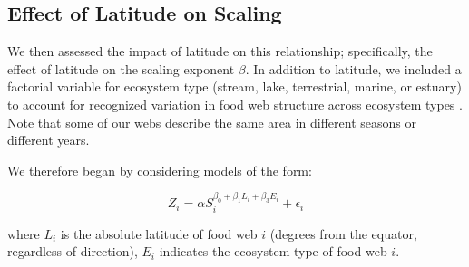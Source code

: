 \documentclass[12pt]{article}
\begin{document}





\subsection*{Effect of Latitude on Scaling}



We then assessed
the impact of latitude on this relationship; specifically, the effect of latitude on the scaling exponent $\beta$. 
In addition to latitude, we included a factorial variable for ecosystem type (stream, lake, terrestrial, marine, or estuary) to account for recognized variation in food web structure across ecosystem types \citep{}.
Note that some of our webs describe the same area in different
seasons or different years. 


We therefore began by considering models of the form:

\begin{equation}
\label{PowerLat}
Z_{i}=\alpha S_{i}^{\beta_{0}+\beta_{1}L_{i}+\beta_{3}E_{i}} + \epsilon_{i} 
\end{equation}

where $L_{i}$ is the absolute latitude of food web $i$ (degrees from the equator, regardless of direction),
$E_{i}$ indicates the ecosystem type of food web $i$.
\end{document}
